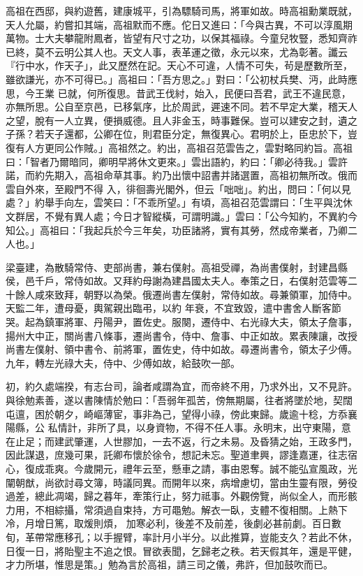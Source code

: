 \begin{pinyinscope}
 高祖在西邸，與約遊舊，建康城平，引為驃騎司馬，將軍如故。時高祖勳業既就，天人允屬，約嘗扣其端，高祖默而不應。佗日又進曰：「今與古異，不可以淳風期萬物。士大夫攀龍附鳳者，皆望有尺寸之功，以保其福祿。今童兒牧豎，悉知齊祚已終，莫不云明公其人也。天文人事，表革運之徵，永元以來，尤為彰著。讖云『行中水，作天子」，此又歷然在記。天心不可違，人情不可失，茍是歷數所至，雖欲謙光，亦不可得已。」高祖曰：「吾方思之。」對曰：「公初杖兵樊、沔，此時應思，今王業
 已就，何所復思。昔武王伐紂，始入，民便曰吾君，武王不違民意，亦無所思。公自至京邑，已移氣序，比於周武，遲速不同。若不早定大業，稽天人之望，脫有一人立異，便損威德。且人非金玉，時事難保。豈可以建安之封，遺之子孫？若天子還都，公卿在位，則君臣分定，無復異心。君明於上，臣忠於下，豈復有人方更同公作賊。」高祖然之。約出，高祖召范雲告之，雲對略同約旨。高祖曰：「智者乃爾暗同，卿明早將休文更來。」雲出語約，約曰：「卿必待我。」雲許諾，而約先期入，高祖命草其事。約乃出懷中詔書并諸選置，高祖初無所改。俄而雲自外來，至殿門不得
 入，徘徊壽光閣外，但云「咄咄」。約出，問曰：「何以見處？」約舉手向左，雲笑曰：「不乖所望。」有頃，高祖召范雲謂曰：「生平與沈休文群居，不覺有異人處；今日才智縱橫，可謂明識。」雲曰：「公今知約，不異約今知公。」高祖曰：「我起兵於今三年矣，功臣諸將，實有其勞，然成帝業者，乃卿二人也。」



 梁臺建，為散騎常侍、吏部尚書，兼右僕射。高祖受禪，為尚書僕射，封建昌縣侯，邑千戶，常侍如故。又拜約母謝為建昌國太夫人。奉策之日，右僕射范雲等二十餘人咸來致拜，朝野以為榮。俄遷尚書左僕射，常侍如故。尋兼領軍，加侍中。天監二年，遭母憂，輿駕親出臨弔，以約
 年衰，不宜致毀，遣中書舍人斷客節哭。起為鎮軍將軍、丹陽尹，置佐史。服闋，遷侍中、右光祿大夫，領太子詹事，揚州大中正，關尚書八條事，遷尚書令，侍中、詹事、中正如故。累表陳讓，改授尚書左僕射、領中書令、前將軍，置佐史，侍中如故。尋遷尚書令，領太子少傅。九年，轉左光祿大夫，侍中、少傅如故，給鼓吹一部。



 初，約久處端揆，有志台司，論者咸謂為宜，而帝終不用，乃求外出，又不見許。與徐勉素善，遂以書陳情於勉曰：「吾弱年孤苦，傍無期屬，往者將墜於地，契闊屯邅，困於朝夕，崎嶇薄宦，事非為己，望得小祿，傍此東歸。歲逾十稔，方忝襄陽縣，公
 私情計，非所了具，以身資物，不得不任人事。永明末，出守東陽，意在止足；而建武肇運，人世膠加，一去不返，行之未易。及昏猜之始，王政多門，因此謀退，庶幾可果，託卿布懷於徐令，想記未忘。聖道聿興，謬逢嘉運，往志宿心，復成乖爽。今歲開元，禮年云至，懸車之請，事由恩奪。誠不能弘宣風政，光闡朝猷，尚欲討尋文簿，時議同異。而開年以來，病增慮切，當由生靈有限，勞役過差，總此凋竭，歸之暮年，牽策行止，努力祗事。外觀傍覽，尚似全人，而形骸力用，不相綜攝，常須過自束持，方可黽勉。解衣一臥，支體不復相關。上熱下冷，月增日篤，取煖則煩，
 加寒必利，後差不及前差，後劇必甚前劇。百日數旬，革帶常應移孔；以手握臂，率計月小半分。以此推算，豈能支久？若此不休，日復一日，將貽聖主不追之恨。冒欲表聞，乞歸老之秩。若天假其年，還是平健，才力所堪，惟思是策。」勉為言於高祖，請三司之儀，弗許，但加鼓吹而已。




\end{pinyinscope}
